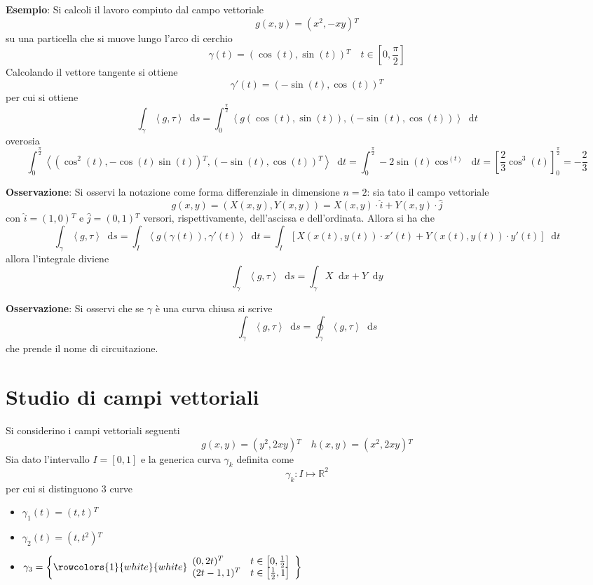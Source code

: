 \documentclass[a4paper]{extarticle}
\newcommand*\dif{\mathop{}\!\mathrm{d}}
\begin{document}
\vspace{2em}
\noindent
\textbf{Esempio}: Si calcoli il lavoro compiuto dal campo vettoriale
\[g(x,y) = (x^2,-xy){^T}\]
su una particella che si muove lungo l'arco di cerchio
\[\gamma(t)=(\cos(t),\sin(t)){^T} \hspace{1em} t \in \left[0,\frac{\pi}{2}\right]\]
Calcolando il vettore tangente si ottiene
\[\gamma'(t)=(-\sin(t),\cos(t)){^T}\]
per cui si ottiene
\[\int_\gamma \left<g,\tau\right>\dif s = \int_0^{\frac{\pi}{2}} \left<g(\cos(t),\sin(t)),(-\sin(t),\cos(t))\right> \dif t\]
overosia
\[\int_0^{\frac{\pi}{2}} \left<(\cos^2(t),-\cos(t)\sin(t)){^T},(-\sin(t),\cos(t)){^T}\right>\dif t = \int_0^{\frac{\pi}{2}}-2\sin(t)\cos^(t) \dif t = \left[\dfrac{2}{3} \cos^3(t)\right]_0^{\frac{\pi}{2}}=-\frac{2}{3}\]

\vspace{2em}
\noindent
\textbf{Osservazione}: Si osservi la notazione come forma differenziale in dimensione $n=2$: sia tato il campo vettoriale
\[g(x,y)=\left(X(x,y),Y(x,y)\right) = X(x,y) \cdot \hat i + Y(x,y) \cdot \hat j\]
con $\hat i = (1,0){^T}$ e $\hat j = (0,1){^T}$ versori, rispettivamente, dell'ascissa e dell'ordinata. Allora si ha che
\[\int_\gamma \left<g,\tau\right> \dif s = \int_I \left<g(\gamma(t)),\gamma'(t)\right> \dif t = \int_I \left[X(x(t),y(t)) \cdot x'(t) + Y(x(t),y(t)) \cdot y'(t)\right] \dif t\]
allora l'integrale diviene
\[\int_\gamma \left<g,\tau\right> \dif s = \int_\gamma X \dif x + Y \dif y\]

\vspace{2em}
\noindent
\textbf{Osservazione}: Si osservi che se $\gamma$ è una curva chiusa si scrive
\[\int_\gamma \left<g,\tau\right> \dif s = \oint_\gamma \left<g,\tau\right> \dif s\]
che prende il nome di circuitazione.

\newpage
\section{Studio di campi vettoriali}


\vspace{2em}
\noindent
Si considerino i campi vettoriali seguenti
\[g(x,y) = (y^2,2xy){^T} \hspace{1em} h(x,y)=\left(x^2,2xy\right){^T}\]
Sia dato l'intervallo $I=[0,1]$ e la generica curva $\gamma_k$ definita come
\[\gamma_k : I \longmapsto \mathbb{R}^2\]
per cui si distinguono $3$ curve
\begin{itemize}
    \item $\gamma_1 (t) = (t,t){^T}$
    \item $\gamma_2 (t) = (t,t^2){^T}$
    \item $\displaystyle{\gamma_3=\left\{
        \rowcolors{1}{white}{white}
        \begin{array}{ll}
            (0,2t){^T} & t \in \left[0,\frac{1}{2}\right]\\
            (2t-1,1){^T} & t \in \left[\frac{1}{2},1\right]\\
        \end{array}    
    \right\}
    }$
\end{itemize}
\end{document}
